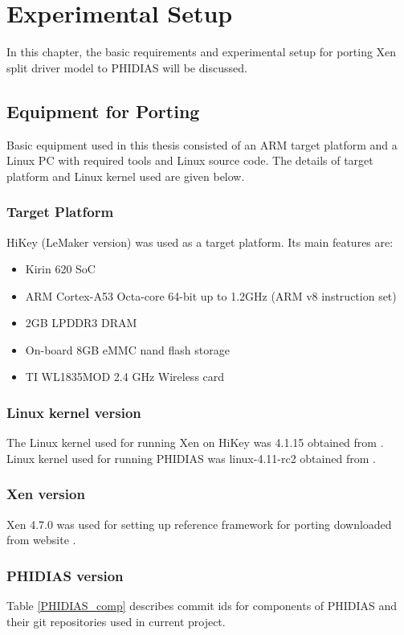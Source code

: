\chapter{Experimental Setup \label{cha:chapter4}}
In this chapter, the basic requirements and experimental setup for porting Xen split driver model to PHIDIAS will be discussed. 

\section{Equipment for Porting\label{sec:xen}}
Basic equipment used in this thesis consisted of an ARM target platform and a Linux PC with required tools and Linux source code. The details of target platform and Linux kernel used are given below.

\subsection{Target Platform\label{sec:xen}}
HiKey (LeMaker version) \cite{hikey} was used as a target platform. Its main features are:
\begin{itemize}
	\item Kirin 620 SoC
	\item ARM Cortex-A53 Octa-core 64-bit up to 1.2GHz (ARM v8 instruction set)
	\item 2GB LPDDR3 DRAM
	\item On-board 8GB eMMC nand flash storage
	\item TI WL1835MOD 2.4 GHz Wireless card
\end{itemize}

\subsection{Linux kernel version\label{sec:xen}}
The Linux kernel used for running Xen on HiKey was 4.1.15 obtained from \cite{96boards_2016}. Linux kernel used for running PHIDIAS was linux-4.11-rc2 obtained from \cite{linux4_11}. 

\subsection{Xen version\label{sec:xen}}
Xen 4.7.0 was used for setting up reference framework for porting downloaded from website \cite{xengit}.

\subsection{PHIDIAS version\label{sec:xen}}
Table \ref{PHIDIAS_comp} describes commit ids for components of PHIDIAS and their git repositories used in current project.

